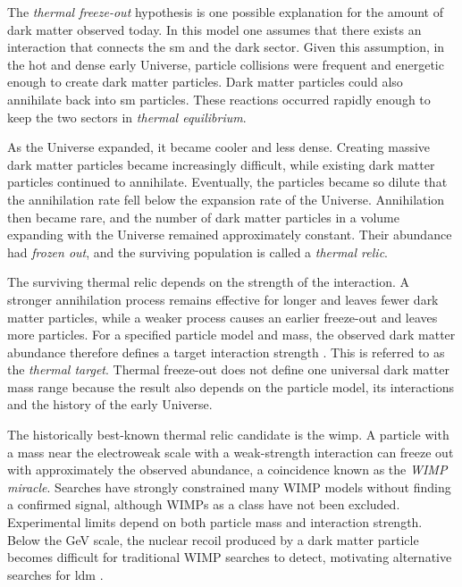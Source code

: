 The \emph{thermal freeze-out} hypothesis is one possible explanation for the
amount of dark matter observed today. In this model one assumes that there exists an interaction
that connects the \gls{sm} and the dark sector. Given this assumption, in the hot and dense early Universe, particle collisions were frequent and energetic enough to create dark matter particles. Dark matter particles could also annihilate back into \gls{sm} particles. These reactions occurred rapidly enough to keep the two
sectors in \emph{thermal equilibrium}. 


As the Universe expanded, it became cooler and less dense. Creating massive
dark matter particles became increasingly difficult, while existing dark matter
particles continued to annihilate. Eventually, the particles became so dilute
that the annihilation rate fell below the expansion rate of the Universe.
Annihilation then became rare, and the number of dark matter particles in a
volume expanding with the Universe remained approximately constant. Their abundance had \emph{frozen out}, and the surviving population is called
a \emph{thermal relic}.

The surviving thermal relic depends on the strength of the interaction. A stronger
annihilation process remains effective for longer and leaves fewer dark matter
particles, while a weaker process causes an earlier freeze-out and leaves more
particles. For a specified particle model and mass, the observed dark matter
abundance therefore defines a target interaction strength
\cite{cirelli2026-darkmatter}. This is referred to as the \emph{thermal target}.
Thermal freeze-out does not define one universal dark matter mass range because
the result also depends on the particle model, its interactions and the history
of the early Universe.

The historically best-known thermal relic candidate is the \gls{wimp}. A
particle with a mass near the electroweak scale with a weak-strength interaction can freeze
out with approximately the observed abundance, a coincidence known as the
\emph{WIMP miracle}. Searches have strongly constrained many WIMP models
without finding a confirmed signal, although WIMPs as a class have not been
excluded. Experimental limits depend on both particle mass and interaction
strength. Below the GeV scale, the nuclear recoil produced by a dark matter
particle becomes difficult for traditional WIMP searches to detect, motivating
alternative searches for \gls{ldm}
\cite{cirelli2026-darkmatter,krnjaic2026-thermal-dark-photon,
ldmx2025-overview}.



